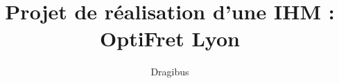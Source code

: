 \documentclass{report}
\begin{document}
\title {Projet de réalisation d'une IHM : OptiFret Lyon}
\author{Dragibus}
\maketitle


\newpage
\tableofcontents
\newpage
\end{document}
